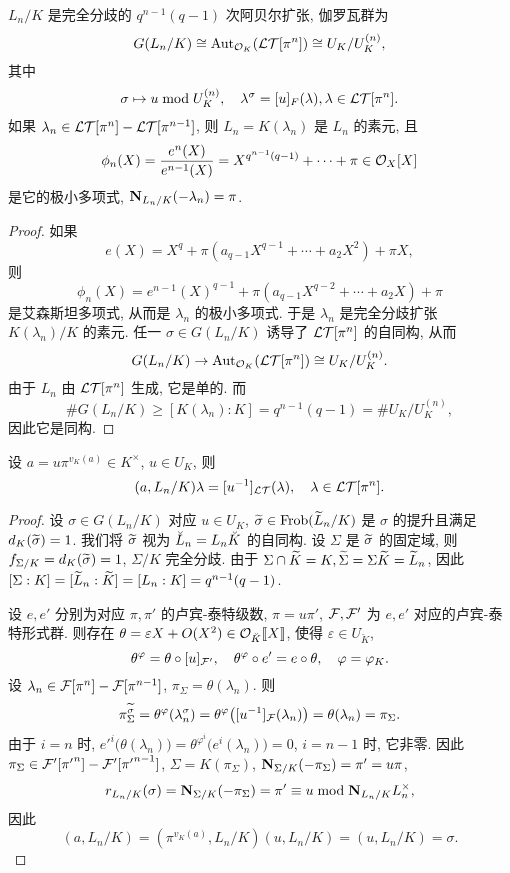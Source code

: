 \begin{theorem}{}{}
$L_n/K$ 是完全分歧的 $q^{n-1}(q-1)$ 次阿贝尔扩张, 伽罗瓦群为
  \[G(L_n/K)\cong{\mathrm{Aut}}_{{\mathcal{O}}_K}(\mathcal{LT}[\pi^n])\cong U_K/U_K^{(n)}, \]
其中 
  \[\sigma\mapsto u\bmod U_K^{(n)},\quad \lambda^\sigma=[u]_F(\lambda),\lambda\in\mathcal{LT}[\pi^n].\]
如果 $\lambda_n\in\mathcal{LT}[\pi^n]-\mathcal{LT}[\pi^{n-1}]$, 则 $L_n=K(\lambda_n)$ 是 $L_n$ 的素元, 且
  \[\phi_n(X)=\frac{e^n(X)}{e^{n-1}(X)}=X^{q^{n-1}(q-1)}+\cdots+\pi\in{\mathcal{O}}_X[X]\]
是它的极小多项式, ${\mathbf{N}}_{L_n/K}(-\lambda_n)=\pi$. 
\end{theorem}
\begin{proof}
如果
  \[e(X)=X^q+\pi(a_{q-1}X^{q-1}+\cdots+a_2X^2)+\pi X,\]
则
  \[\phi_n(X)=e^{n-1}(X)^{q-1}+\pi(a_{q-1}X^{q-2}+\cdots+a_2X)+\pi \]
是艾森斯坦多项式, 从而是 $\lambda_n$ 的极小多项式. 于是 $\lambda_n$ 是完全分歧扩张 $K(\lambda_n)/K$ 的素元. 任一 $\sigma\in G(L_n/K)$ 诱导了 $\mathcal{LT}[\pi^n]$ 的自同构, 从而
  \[G(L_n/K)\to {\mathrm{Aut}}_{{\mathcal{O}}_K}(\mathcal{LT}[\pi^n])\cong U_K/U_K^{(n)}.\]
由于 $L_n$ 由 $\mathcal{LT}[\pi^n]$ 生成, 它是单的. 而
  \[\#G(L_n/K)\ge [K(\lambda_n):K]=q^{n-1}(q-1)=\# U_K/U_K^{(n)},\]
因此它是同构.
\end{proof}

\begin{theorem}{}{}
设 $a=u\pi^{v_K(a)}\in K^\times$, $u\in U_K$, 则
  \[(a,L_n/K)\lambda=[u^{-1}]_{\mathcal{LT}}(\lambda),\quad\lambda\in\mathcal{LT}[\pi^n].\]
\end{theorem}
\begin{proof}
设 $\sigma\in G(L_n/K)$ 对应 $u\in U_K$, $\widetilde \sigma\in{\mathrm{Frob}}(\widetilde L_n/K)$ 是 $\sigma$ 的提升且满足 $d_K(\widetilde\sigma)=1$. 我们将 $\widetilde \sigma$ 视为 $\breve L_n=L_n{\breve K}$ 的自同构. 设 $\Sigma$ 是 $\widetilde\sigma$ 的固定域, 则 $f_{\Sigma/K}=d_K(\widetilde \sigma)=1$, $\Sigma/K$ 完全分歧. 由于 $\Sigma\cap \widetilde K=K,\widetilde\Sigma=\Sigma\widetilde K=\widetilde L_n$, 因此 $[\Sigma:K]=[\widetilde L_n:\widetilde K]=[L_n:K]=q^{n-1}(q-1)$.

设 $e,e'$ 分别为对应 $\pi,\pi'$ 的卢宾-泰特级数, $\pi=u\pi'$, ${\mathcal{F}},{\mathcal{F}}'$ 为 $e,e'$ 对应的卢宾-泰特形式群. 则存在 $\theta=\varepsilon X+O(X^2)\in{\mathcal{O}}_{\breve K}\llbracket X\rrbracket$, 使得 $\varepsilon\in U_{\breve K}$,
  \[\theta^\varphi=\theta\circ [u]_{{\mathcal{F}}'},\quad
\theta^\varphi\circ e'=e\circ \theta, \quad\varphi=\varphi_K.\]
设 $\lambda_n\in {\mathcal{F}}[\pi^n]-{\mathcal{F}}[\pi^{n-1}]$, $\pi_\Sigma=\theta(\lambda_n)$. 则 
  \[\pi_{\Sigma}^{\widetilde \sigma}=\theta^{\varphi}(\lambda_n^\sigma)=\theta^\varphi\bigl([u^{-1}]_{\mathcal{F}} (\lambda_n)\bigr)=\theta(\lambda_n)=\pi_\Sigma.\]
由于 $i=n$ 时, ${e'}^i\bigl(\theta(\lambda_n)\bigr)=\theta^{\varphi^i}\bigl({e}^i(\lambda_n)\bigr)=0$, $i=n-1$ 时, 它非零. 因此 $\pi_\Sigma\in {\mathcal{F}}'[{\pi'}^n]-{\mathcal{F}}'[{\pi'}^{n-1}]$, $\Sigma=K(\pi_\Sigma)$, ${\mathbf{N}}_{\Sigma/K}(-\pi_\Sigma)=\pi'=u\pi$,
  \[r_{L_n/K}(\sigma)={\mathbf{N}}_{\Sigma/K}(-\pi_\Sigma)=\pi'\equiv u\bmod {\mathbf{N}}_{L_n/K}L_n^\times,\]
因此
  \[(a,L_n/K)=(\pi^{v_K(a)},L_n/K)(u,L_n/K)=(u,L_n/K)=\sigma.\]
\end{proof}


